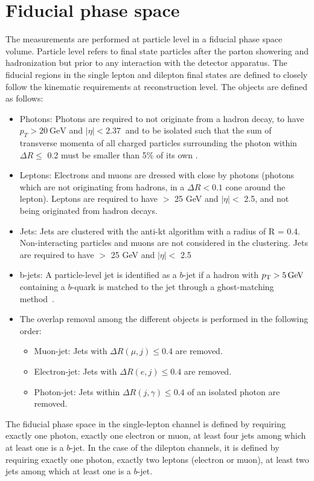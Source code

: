 \section{Fiducial phase space}
\label{sec:fiducial-phase-space}
The measurements are performed at particle level in a fiducial phase space volume. Particle level refers to final state particles after the parton showering and hadronization but prior to any interaction with the detector apparatus. The fiducial regions in the single lepton and dilepton final states are defined to closely follow the kinematic requirements at reconstruction level. The objects are defined as follows:
\begin{itemize}
\item Photons: Photons are required to not originate from a hadron decay, to have $p_T > \SI{20}{\GeV}$ and $|\eta| < \SI{2.37}{}$ and to be isolated such that the sum of transverse momenta of all charged particles surrounding the photon within $\Delta R \leq$ 0.2 must be smaller than 5\% of its own \pt.
\item Leptons: Electrons and muons are dressed with close by photons (photons which are not originating
from hadrons, in a $\Delta R <0.1$ cone around the lepton). Leptons are required to have \pt $>$ 25 GeV
and $|\eta|<$ 2.5, and not being originated from hadron decays.
\item Jets: Jets are clustered with the anti-kt algorithm with a radius of R = 0.4. Non-interacting particles and
muons are not considered in the clustering. Jets are required to have \pt $>$ 25 GeV
and $|\eta|<$ 2.5
\item b-jets: A particle-level jet is identified as a $b$-jet if a hadron with $\pT > \SI{5}{\GeV}$ containing a $b$-quark is matched to the jet through a ghost-matching method~\cite{Cacciari:2008gn}.
\item The overlap removal among the different objects is performed in the following order:
\begin{itemize}
\item Muon-jet: Jets with $\Delta R(\mu, j)\leq 0.4$ are removed.
\item Electron-jet: Jets with $\Delta R(e, j)\leq 0.4$ are removed.
\item Photon-jet: Jets within $\Delta R( j, \gamma) \leq 0.4$ of an isolated photon are removed.
\end{itemize}
\end{itemize}

The fiducial phase space in the single-lepton channel is defined by requiring exactly one photon, exactly one electron or muon, at least four jets among which at least one is a $b$-jet. In the case of the dilepton channels, it is defined by requiring exactly one photon, exactly two leptons (electron or muon), at least two jets among which at least one is a $b$-jet.

